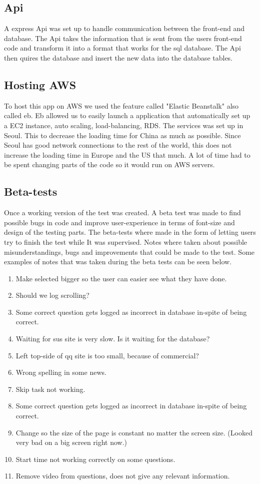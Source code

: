 \subsection{Api}
A express Api was set up to handle communication between the front-end and database. The Api takes the information that is sent from the users front-end code and transform it into a format that works for the sql database. The Api then quires the database and insert the new data into the database tables.

\subsection{Hosting AWS}
To host this app on AWS we used the feature called "Elastic Beanstalk" also called eb. Eb allowed us to easily launch a application that automatically set up a EC2 instance, auto scaling, load-balancing, RDS. The services was set up in Seoul. This to decrease the loading time for China as much as possible. Since Seoul has good network connections to the rest of the world, this does not increase the loading time in Europe and the US that much. A lot of time had to be spent changing parts of the code so it would run on AWS servers.

\subsection{Beta-tests}
Once a working version of the test was created. A beta test was made to find possible bugs in code and improve user-experience in terms of font-size and design of the testing parts.
The beta-tests where made in the form of letting users try to finish the test while It was supervised. Notes where taken about possible misunderstandings, bugs and improvements that could be made to the test. Some examples of notes that was taken during the beta tests can be seen below. 

\begin{enumerate}
	\item Make selected bigger so the user can easier see what they have done.
	\item Should we log scrolling?
	\item Some correct question gets logged as incorrect in database in-spite of being correct.
	\item Waiting for sus site is very slow. Is it waiting for the database?
	\item Left top-side of qq site is too small, because of commercial?
	\item Wrong spelling in some news.
	\item Skip task not working.
	\item Some correct question gets logged as incorrect in database in-spite of being correct.
	\item Change so the size of the page is constant no matter the screen size. (Looked very bad on a big screen right now.)
	\item Start time not working correctly on some questions.
	\item Remove video from questions, does not give any relevant information.
\end{enumerate}


